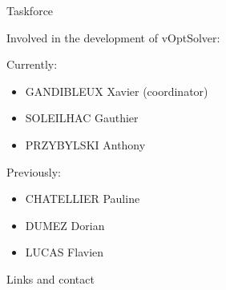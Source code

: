 \documentclass[10pt,xcolor=dvipsnames]{beamer}
\begin{document}
%
% 
\begin{frame}{Taskforce}

Involved in the development of vOptSolver:\\
\vspace{5mm}

Currently:
\begin{itemize}
  \item GANDIBLEUX Xavier  (coordinator)
  \item SOLEILHAC Gauthier
  \item PRZYBYLSKI Anthony
\end{itemize}
\vspace{5mm}

Previously:
\begin{itemize}
  \item CHATELLIER Pauline
  \item DUMEZ Dorian  
  \item LUCAS Flavien  
\end{itemize}
\end{frame}


%
% 
\begin{frame}

\begin{center}
{\Large
 \textcolor[RGB]{52,57,176}{
   Links and contact
 }
} 
\end{center}
\end{frame}
\end{document}
